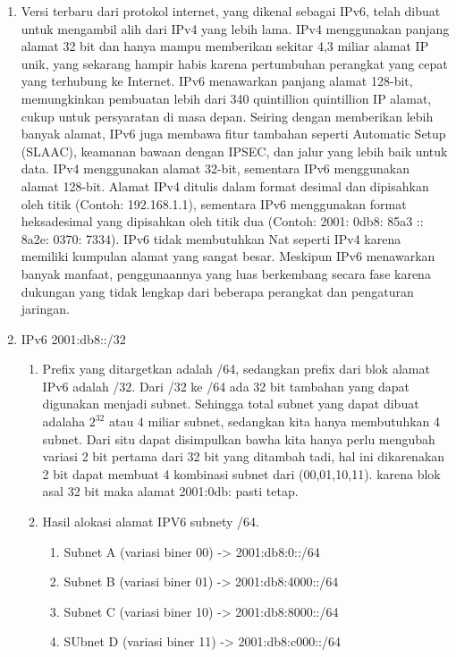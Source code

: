 \begin{enumerate}
	\item Versi terbaru dari protokol internet, yang dikenal sebagai IPv6, telah dibuat untuk mengambil alih dari IPv4 yang lebih lama. IPv4 menggunakan panjang alamat 32 bit dan hanya mampu memberikan sekitar 4,3 miliar alamat IP unik, yang sekarang hampir habis karena pertumbuhan perangkat yang cepat yang terhubung ke Internet. IPv6 menawarkan panjang alamat 128-bit, memungkinkan pembuatan lebih dari 340 quintillion quintillion IP alamat, cukup untuk persyaratan di masa depan. Seiring dengan memberikan lebih banyak alamat, IPv6 juga membawa fitur tambahan seperti Automatic Setup (SLAAC), keamanan bawaan dengan IPSEC, dan jalur yang lebih baik untuk data.
    IPv4 menggunakan alamat 32-bit, sementara IPv6 menggunakan alamat 128-bit. Alamat IPv4 ditulis dalam format desimal dan dipisahkan oleh titik (Contoh: 192.168.1.1), sementara IPv6 menggunakan format heksadesimal yang dipisahkan oleh titik dua (Contoh: 2001: 0db8: 85a3 :: 8a2e: 0370: 7334). IPv6 tidak membutuhkan Nat seperti IPv4 karena memiliki kumpulan alamat yang sangat besar. Meskipun IPv6 menawarkan banyak manfaat, penggunaannya yang luas berkembang secara fase karena dukungan yang tidak lengkap dari beberapa perangkat dan pengaturan jaringan.
    
	\item IPv6 2001:db8::/32
        \begin{enumerate} [label=\alph*)]
            \item Prefix yang ditargetkan adalah /64, sedangkan prefix dari blok alamat IPv6 adalah /32. Dari /32 ke /64 ada 32 bit tambahan yang dapat digunakan menjadi subnet. Sehingga total subnet yang dapat dibuat adalaha $2^{32}$ atau 4 miliar subnet, sedangkan kita hanya membutuhkan 4 subnet. Dari situ dapat disimpulkan bawha kita hanya perlu mengubah variasi 2 bit pertama dari 32 bit yang ditambah tadi, hal ini dikarenakan 2 bit dapat membuat 4 kombinasi subnet dari (00,01,10,11). karena blok asal 32 bit maka alamat 2001:0db: pasti tetap.
            \item Hasil alokasi alamat IPV6 subnety /64.
            \begin{enumerate} [label =\alph*]
                \item Subnet A (variasi biner 00) -> 2001:db8:0::/64
                \item Subnet B (variasi biner 01) -> 2001:db8:4000::/64
                \item Subnet C (variasi biner 10) -> 2001:db8:8000::/64
                \item SUbnet D (variasi biner 11) -> 2001:db8:c000::/64
            \end{enumerate}
        \end{enumerate}
            

\end{enumerate}
